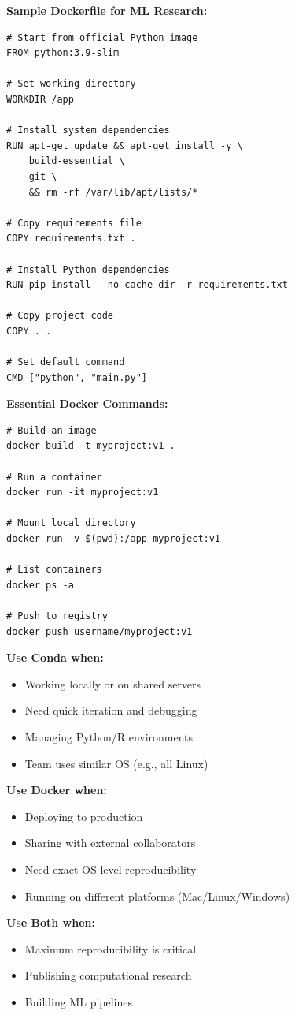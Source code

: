 \documentclass[11pt,a4paper]{article}
\begin{document}
\textbf{Sample Dockerfile for ML Research:}

\begin{lstlisting}[style=pythonstyle, caption=Dockerfile]
# Start from official Python image
FROM python:3.9-slim

# Set working directory
WORKDIR /app

# Install system dependencies
RUN apt-get update && apt-get install -y \
    build-essential \
    git \
    && rm -rf /var/lib/apt/lists/*

# Copy requirements file
COPY requirements.txt .

# Install Python dependencies
RUN pip install --no-cache-dir -r requirements.txt

# Copy project code
COPY . .

# Set default command
CMD ["python", "main.py"]
\end{lstlisting}

\textbf{Essential Docker Commands:}

\begin{lstlisting}[style=bashstyle]
# Build an image
docker build -t myproject:v1 .

# Run a container
docker run -it myproject:v1

# Mount local directory
docker run -v $(pwd):/app myproject:v1

# List containers
docker ps -a

# Push to registry
docker push username/myproject:v1
\end{lstlisting}

\begin{tcolorbox}[colback=red!5,colframe=red!40,title={\faExclamationTriangle~When to Use What?}]
\textbf{Use Conda when:}
\begin{itemize}
    \item Working locally or on shared servers
    \item Need quick iteration and debugging
    \item Managing Python/R environments
    \item Team uses similar OS (e.g., all Linux)
\end{itemize}

\textbf{Use Docker when:}
\begin{itemize}
    \item Deploying to production
    \item Sharing with external collaborators
    \item Need exact OS-level reproducibility
    \item Running on different platforms (Mac/Linux/Windows)
\end{itemize}

\textbf{Use Both when:}
\begin{itemize}
    \item Maximum reproducibility is critical
    \item Publishing computational research
    \item Building ML pipelines
\end{itemize}
\end{tcolorbox}
\end{document}
